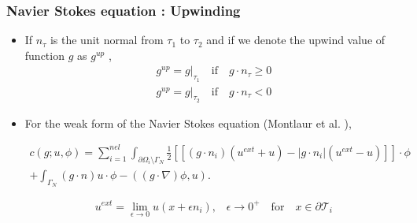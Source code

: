 \documentclass{beamer}
\begin{document}
\begin{frame}
\frametitle{Navier Stokes equation : Upwinding}
\begin{itemize}

\item If $n_\tau$ is the unit normal from $\tau_1$ to $\tau_2$ and if we denote the upwind value of function $g$ as $g^{up}$ \cite{riviere},
\begin{equation}
\begin{split}
g^{up} = g|_{\tau_1} \quad \textrm{if} \quad g \cdot n_\tau \geq 0 \\
g^{up} = g|_{\tau_2} \quad \textrm{if} \quad g \cdot n_\tau < 0
\end{split}
\end{equation}

\item For the weak form of the Navier Stokes equation (Montlaur et al. \cite{Montlaur}),

\begin{equation}
\begin{split}
c(g;u,\phi) = \sum_{i=1}^{nel} \int_{\partial \Omega_i \setminus \Gamma_N} \frac{1}{2} [[(g \cdot n_i)(u^{ext} + u) - |g \cdot n_i|(u^{ext} - u)]] \cdot \phi \\ + \int_{\Gamma_N} (g\cdot n) u \cdot \phi -((g\cdot \nabla)\phi,u) \textrm{.}
\end{split}
\end{equation}

\begin{equation} \label{uext}
u^{ext} = \lim_{\epsilon \rightarrow 0} u(x+\epsilon n_i) \textrm{,} \quad \epsilon \to 0^+ \quad  \textrm{for} \quad x \in \partial \mathcal{T}_i
\end{equation}

\end{itemize}
\end{frame}


\end{document}
